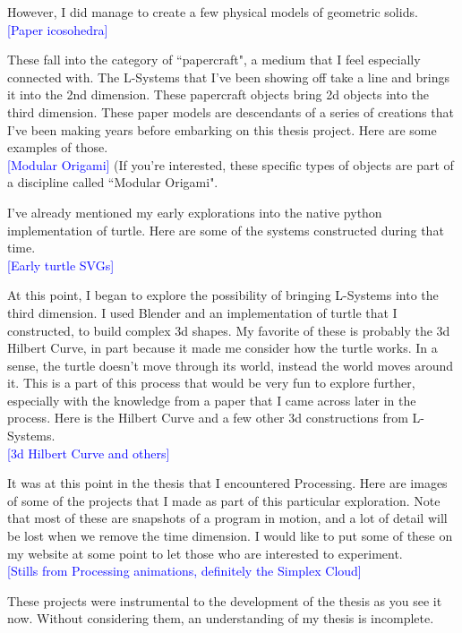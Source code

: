 \documentclass[12pt,twoside]{reedthesis}
\begin{document}
	However, I did manage to create a few physical models of geometric solids.\\
	\textcolor{blue}{[Paper icosohedra]}
	
	These fall into the category of ``papercraft", a medium that I feel especially connected with. The L-Systems that I've been showing off take a line and brings it into the 2nd dimension. These papercraft objects bring 2d objects into the third dimension. These paper models are descendants of a series of creations that I've been making years before embarking on this thesis project. Here are some examples of those.\\
	\textcolor{blue}{[Modular Origami]} (If you're interested, these specific types of objects are part of a discipline called ``Modular Origami".
	
	I've already mentioned my early explorations into the native python implementation of turtle. Here are some of the systems constructed during that time.\\
	\textcolor{blue}{[Early turtle SVGs]}
	
	At this point, I began to explore the possibility of bringing L-Systems into the third dimension. I used Blender and an implementation of turtle that I constructed, to build complex 3d shapes. My favorite of these is probably the 3d Hilbert Curve, in part because it made me consider how the turtle works. In a sense, the turtle doesn't move through its world, instead the world moves around it. This is a part of this process that would be very fun to explore further, especially with the knowledge from a paper that I came across later in the process. Here is the Hilbert Curve and a few other 3d constructions from L-Systems.\\
	\textcolor{blue}{[3d Hilbert Curve and others]}
	
	It was at this point in the thesis that I encountered Processing. Here are images of some of the projects that I made as part of this particular exploration. Note that most of these are snapshots of a program in motion, and a lot of detail will be lost when we remove the time dimension. I would like to put some of these on my website at some point to let those who are interested to experiment.\\
	\textcolor{blue}{[Stills from Processing animations, definitely the Simplex Cloud]}
	
	These projects were instrumental to the development of the thesis as you see it now. Without considering them, an understanding of my thesis is incomplete.\\
\end{document}
